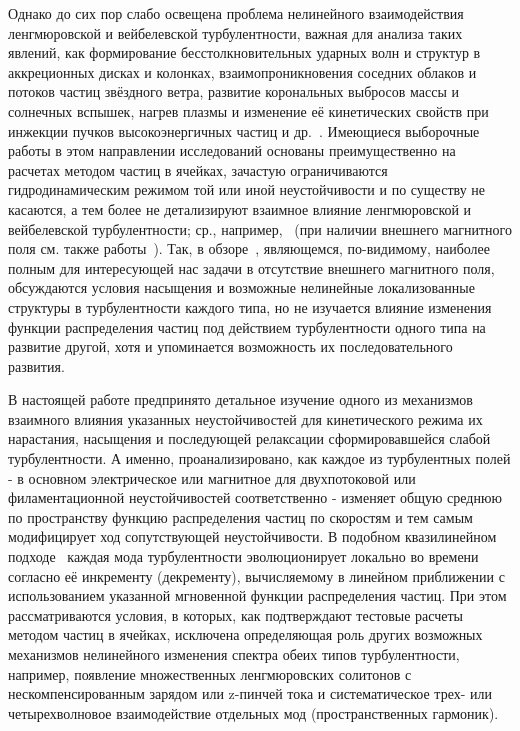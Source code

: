Однако до сих пор слабо освещена проблема нелинейного взаимодействия ленгмюровской и вейбелевской турбулентности, важная для анализа таких явлений, как формирование бесстолкновительных ударных волн и структур в аккреционных дисках и колонках, взаимопроникновения соседних облаков и потоков частиц звёздного ветра, развитие корональных выбросов массы и солнечных вспышек, нагрев плазмы и изменение её кинетических свойств при инжекции пучков высокоэнергичных частиц и др.~\cite{Marcowith2016,Treumann2015,Aschwanden2005,Medvedev2006,Nishikawa2009,Kato2007,Kuznetsov2025b}. Имеющиеся выборочные работы в этом направлении исследований основаны преимущественно на расчетах методом частиц в ячейках, зачастую ограничиваются гидродинамическим режимом той или иной неустойчивости и по существу не касаются, а тем более не детализируют взаимное влияние ленгмюровской и вейбелевской  турбулентности; ср., например,~\cite{Kong2009,Ruyer2015,Bret2010,Lazar2023} (при наличии внешнего магнитного поля см. также работы~\cite{Lazar2023,Lopez2020}). Так, в обзоре~\cite{Bret2010}, являющемся, по-видимому, наиболее полным для интересующей нас задачи в отсутствие внешнего магнитного поля, обсуждаются условия насыщения и возможные нелинейные локализованные структуры в турбулентности каждого типа, но не изучается влияние изменения функции распределения частиц под действием турбулентности одного типа на развитие другой, хотя и упоминается возможность их последовательного развития.

В настоящей работе предпринято детальное изучение одного из механизмов взаимного влияния указанных неустойчивостей для кинетического режима их нарастания, насыщения и последующей релаксации сформировавшейся слабой турбулентности. А именно, проанализировано, как каждое из турбулентных полей - в основном электрическое или магнитное для двухпотоковой или филаментационной неустойчивостей соответственно - изменяет общую среднюю по пространству функцию распределения частиц по скоростям и тем самым модифицирует ход сопутствующей неустойчивости. В подобном квазилинейном подходе~\cite{VedenovRyutov1975,Appert1976,Kuznetsov2022,Kuznetsov2023} каждая мода турбулентности эволюционирует локально во времени согласно её инкременту (декременту), вычисляемому в линейном приближении с использованием указанной мгновенной функции распределения частиц. При этом рассматриваются условия, в которых, как подтверждают тестовые расчеты методом частиц в ячейках, исключена определяющая роль других возможных механизмов нелинейного изменения спектра обеих типов турбулентности, например, появление множественных ленгмюровских солитонов с нескомпенсированным зарядом или z-пинчей тока и систематическое трех- или четырехволновое взаимодействие отдельных мод (пространственных гармоник).

